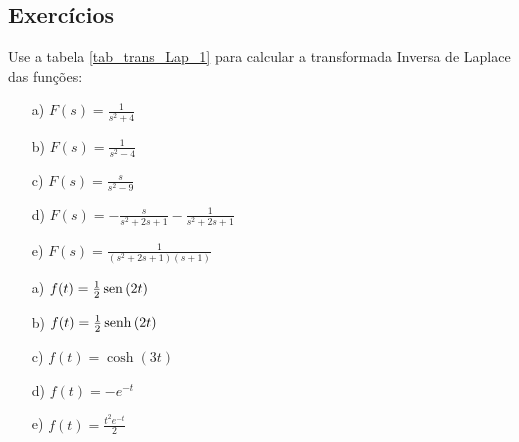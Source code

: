 \subsection*{Exercícios}

 \begin{exer}Use a tabela \ref{tab_trans_Lap_1} para calcular a transformada Inversa de Laplace das funções:
 \begin{itemize}
  \item[a)] $F(s)=\frac{1}{s^2+4}$
  \item[b)] $F(s)=\frac{1}{s^2-4}$
  \item[c)] $F(s)=\frac{s}{s^2-9}$
  \item[d)] $F(s)=-\frac{s}{s^2+2s+1}-\frac{1}{s^2+2s+1}$ 
  \item[e)] $F(s)=\frac{1}{(s^2+2s+1)(s+1)}$ 
 \end{itemize}
\end{exer}
\begin{resp}
 \begin{itemize}
  \item[a)] $f(t)=\frac{1}{2}\operatorname{sen}\,(2t)$
  \item[b)] $f(t)=\frac{1}{2}\operatorname{senh}\,(2t)$ 
  \item[c)] $f(t)=\cosh(3t)$
  \item[d)] $f(t)=-e^{-t}$ 
  \item[e)] $f(t)=\frac{t^2e^{-t}}{2}$ 
  \end{itemize}
\end{resp}
